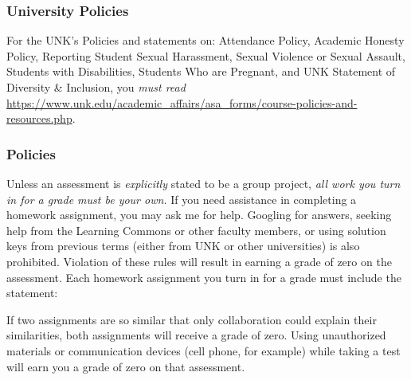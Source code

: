 \documentclass[12pt]{article}
\newcounter{ex}\setcounter{ex}{0}
\begin{document}
\subsubsection*{University Policies}

For the UNK's Policies and statements on: Attendance Policy, Academic Honesty Policy, 
Reporting Student Sexual Harassment, Sexual Violence or Sexual Assault, Students 
with Disabilities, Students Who are Pregnant, and UNK Statement of Diversity 
\& Inclusion,  you \emph{must read}
\url{https://www.unk.edu/academic_affairs/asa_forms/course-policies-and-resources.php}.

\subsubsection* {Policies}

Unless an assessment is \emph{explicitly} stated to be a group project,  \emph{all work you turn in for a grade must be your own.}  If you need assistance in completing a homework assignment, you may ask me for help. Googling for answers, seeking help from the Learning Commons or other faculty members,  or using solution keys from previous terms (either from UNK or other universities) is also prohibited.  Violation of these rules will result in earning a grade of zero on the assessment. Each homework assignment you turn in for a grade must include the statement:

\begin{quote}
\end{quote}
 If two assignments are so similar that only collaboration could explain their similarities, both assignments will receive a grade of zero.  Using unauthorized materials or communication devices (cell phone, for
example) while taking a test will earn you a grade of zero on that assessment.  

 
\end{document}
